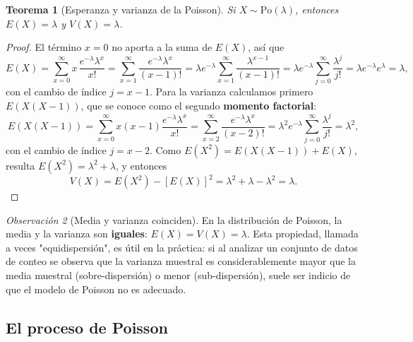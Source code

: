 \documentclass[11pt,a4paper]{article}
\theoremstyle{plain}
\newtheorem{teorema}{Teorema}[section]
\theoremstyle{definition}
\theoremstyle{remark}
\newtheorem{observacion}[teorema]{Observación}
\begin{document}
\begin{teorema}[Esperanza y varianza de la Poisson]
Si $X\sim\text{Po}(\lambda)$, entonces $E(X)=\lambda$ y $V(X)=\lambda$.
\end{teorema}
\begin{proof}
El término $x=0$ no aporta a la suma de $E(X)$, así que
$$E(X)=\sum_{x=0}^\infty x\,\frac{e^{-\lambda}\lambda^x}{x!}=\sum_{x=1}^\infty\frac{e^{-\lambda}\lambda^x}{(x-1)!}=\lambda e^{-\lambda}\sum_{x=1}^\infty\frac{\lambda^{x-1}}{(x-1)!}=\lambda e^{-\lambda}\sum_{j=0}^\infty\frac{\lambda^j}{j!}=\lambda e^{-\lambda}e^\lambda=\lambda,$$
con el cambio de índice $j=x-1$. Para la varianza calculamos primero $E(X(X-1))$, que se conoce como el segundo \textbf{momento factorial}:
$$E(X(X-1))=\sum_{x=0}^\infty x(x-1)\frac{e^{-\lambda}\lambda^x}{x!}=\sum_{x=2}^\infty\frac{e^{-\lambda}\lambda^x}{(x-2)!}=\lambda^2e^{-\lambda}\sum_{j=0}^\infty\frac{\lambda^j}{j!}=\lambda^2,$$
con el cambio de índice $j=x-2$. Como $E(X^2)=E(X(X-1))+E(X)$, resulta $E(X^2)=\lambda^2+\lambda$, y entonces
$$V(X)=E(X^2)-[E(X)]^2=\lambda^2+\lambda-\lambda^2=\lambda.$$
\end{proof}

\begin{observacion}[Media y varianza coinciden]
En la distribución de Poisson, la media y la varianza son \textbf{iguales}: $E(X)=V(X)=\lambda$. Esta propiedad, llamada a veces "equidispersión", es útil en la práctica: si al analizar un conjunto de datos de conteo se observa que la varianza muestral es considerablemente mayor que la media muestral (sobre-dispersión) o menor (sub-dispersión), suele ser indicio de que el modelo de Poisson no es adecuado.
\end{observacion}

\begin{center}
\end{center}

\subsection{El proceso de Poisson}
\end{document}
